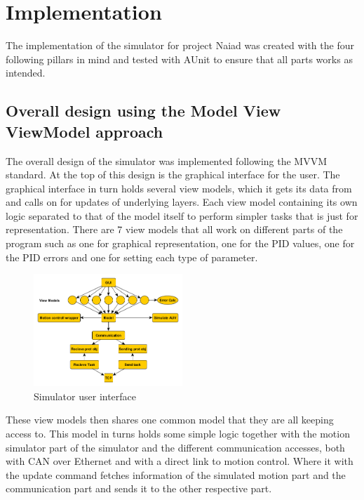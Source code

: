 \section{Implementation}\label{sec:implementation}
The implementation of the simulator for project Naiad was created with the four following pillars in mind and tested with AUnit to ensure that all parts works as intended.

\subsection{Overall design using the Model View ViewModel approach}

The overall design of the simulator was implemented following the MVVM standard. At the top of this design is the graphical interface for the user. The graphical interface in turn holds several view models, which it gets its data from and calls on for updates of underlying layers. Each view model containing its own logic separated to that of the model itself to perform simpler tasks that is just for representation. There are 7 view models that all work on different parts of the program such as one for graphical representation, one for the PID values, one for the PID errors and one for setting each type of parameter.

\begin{figure}[h]
    \includegraphics[width=0.5\textwidth]{./figure/Schedule.png}
    \caption{Simulator user interface}
    \label{fig:schedule}
\end{figure}


These view models then shares one common model that they are all keeping access to. This model in turns holds some simple logic together with the motion simulator part of the simulator and the different communication accesses, both with CAN over Ethernet and with a direct link to motion control. Where it with the update command fetches information of the simulated motion part and the communication part and sends it to the other respective part.

